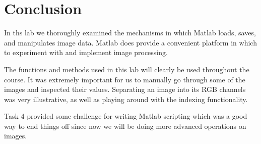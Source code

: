\section{Conclusion}

In ths lab we thoroughly examined the mechanisms in which Matlab loads, saves,
and manipulates image data. Matlab does provide a convenient platform in which
to experiment with and implement image processing. 

The functions and methods used in this lab will clearly be used throughout the
course. It was extremely important for us to manually go through some of the
images and inspected their values. Separating an image into its RGB channels was
very illustrative, as well as playing around with the indexing functionality.

Task 4 provided some challenge for writing Matlab scripting which was a good way
to end things off since now we will be doing more advanced operations on images.
